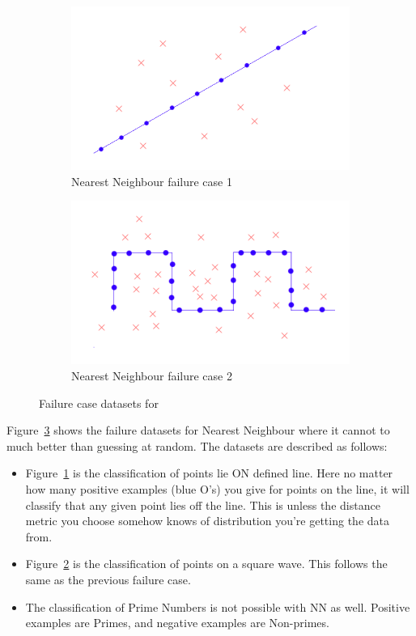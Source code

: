 \documentclass[letterpaper,10pt]{article} %
\begin{document}
\begin{figure}[h!]
\centering
\begin{subfigure}[b]{\textwidth}
\includegraphics[width=\textwidth]{handout/3-2/NN1}
\caption{Nearest Neighbour failure case 1}
\label{fig:failnn1}
\end{subfigure}%

\begin{subfigure}[b]{\textwidth}
\includegraphics[width=\textwidth]{handout/3-2/NN2}
\caption{Nearest Neighbour failure case 2}
\label{fig:failnn2}
\end{subfigure}

\caption{Failure case datasets for }\label{fig:failnn}
\end{figure}

Figure~\ref{fig:failnn} shows the failure datasets for Nearest Neighbour where it cannot to much better than guessing at random. The datasets are described as follows:

\begin{itemize}
\item Figure~\ref{fig:failnn1} is the classification of points lie ON defined line. Here no matter how many positive examples (blue O's) you give for points on the line, it will classify that any given point lies off the line. This is unless the distance metric you choose somehow knows of distribution you're getting the data from.
\item Figure~\ref{fig:failnn2} is the classification of points on a square wave. This follows the same as the previous failure case.
\item The classification of Prime Numbers is not possible with NN as well. Positive examples are Primes, and negative examples are Non-primes.
\end{itemize}

%
%

\end{document}
